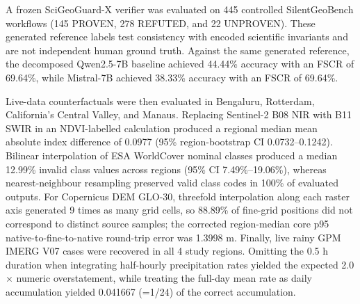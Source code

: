 A frozen SciGeoGuard-X verifier was evaluated on 445 controlled
SilentGeoBench workflows (145 PROVEN,
278 REFUTED, and 22 UNPROVEN).
These generated reference labels test consistency with encoded scientific invariants and are
not independent human ground truth. Against the same generated reference, the decomposed
Qwen2.5-7B baseline achieved 44.44\% accuracy with an FSCR of 69.64\%,
while Mistral-7B achieved 38.33\% accuracy with an FSCR of 69.64\%.

Live-data counterfactuals were then evaluated in Bengaluru, Rotterdam, California's Central
Valley, and Manaus. Replacing Sentinel-2 B08 NIR with B11 SWIR in an NDVI-labelled
calculation produced a regional median mean absolute index difference of
0.0977 (95\% region-bootstrap CI 0.0732--0.1242). Bilinear interpolation of
ESA WorldCover nominal classes produced a median
12.99\% invalid class values
across regions (95\% CI 7.49\%--19.06\%), whereas nearest-neighbour resampling preserved valid class codes in
100\% of evaluated outputs.
For Copernicus DEM GLO-30, threefold interpolation along each raster axis generated
9 times as many grid cells, so
88.89\% of fine-grid positions did not correspond
to distinct source samples; the corrected region-median core p95 native-to-fine-to-native
round-trip error was 1.3998 m.
Finally, live rainy GPM IMERG V07 cases were recovered in all
4 study regions. Omitting the 0.5 h duration when integrating
half-hourly precipitation rates yielded the expected
2.0$\times$ numeric overstatement, while treating the
full-day mean rate as daily accumulation yielded
0.041667 (=1/24) of the correct accumulation.
